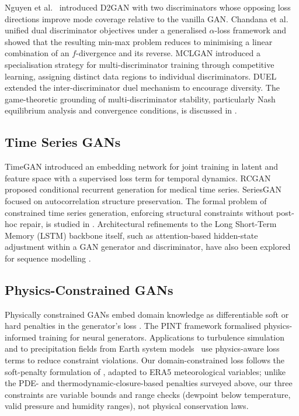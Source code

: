 \documentclass[preprint,12pt]{elsarticle}
\begin{document}
Nguyen et al.~\cite{nguyen2017d2gan} introduced D2GAN with two discriminators
whose opposing loss directions improve mode coverage relative to the
vanilla GAN.  Chandana et al.~\cite{kurri2024generalised} unified dual
discriminator objectives under a generalised $\alpha$-loss framework and
showed that the resulting min-max problem reduces to minimising a linear
combination of an $f$-divergence and its reverse.  MCLGAN \cite{mclgan2021}
introduced a specialisation strategy for multi-discriminator training
through competitive learning, assigning distinct data regions to individual
discriminators.  DUEL \cite{duelgan2022} extended the inter-discriminator
duel mechanism to encourage diversity.  The game-theoretic grounding of
multi-discriminator stability, particularly Nash equilibrium analysis and
convergence conditions, is discussed in \cite{mescheder2018convergence}.

\subsection{Time Series GANs}

TimeGAN \cite{yoon2019timegan} introduced an embedding network for joint
training in latent and feature space with a supervised loss term for
temporal dynamics.  RCGAN \cite{esteban2017rcgan} proposed conditional
recurrent generation for medical time series.  SeriesGAN \cite{seriesgan}
focused on autocorrelation structure preservation.  The formal problem of
constrained time series generation, enforcing structural constraints
without post-hoc repair, is studied in \cite{lin2020constrained}.
Architectural refinements to the Long Short-Term Memory (LSTM) backbone itself, such as
attention-based hidden-state adjustment within a GAN generator and
discriminator, have also been explored for sequence modelling
\cite{adjustedlstm}.

\subsection{Physics-Constrained GANs}

Physically constrained GANs embed domain knowledge as differentiable
soft or hard penalties in the generator's loss
\cite{physics_gan_turb,physics_constrained_gan}.  The PINT framework
\cite{pint} formalised physics-informed training for neural generators.
Applications to turbulence simulation~\cite{physics_gan_turb} and to
precipitation fields from Earth system models~\cite{physics_constrained_gan}
use physics-aware loss terms to reduce constraint violations.
Our domain-constrained loss follows the soft-penalty formulation of
\cite{physics_constrained_gan}, adapted to ERA5 meteorological variables;
unlike the PDE- and thermodynamic-closure-based penalties surveyed above,
our three constraints are variable bounds and range checks (dewpoint
below temperature, valid pressure and humidity ranges), not physical
conservation laws.
\end{document}

